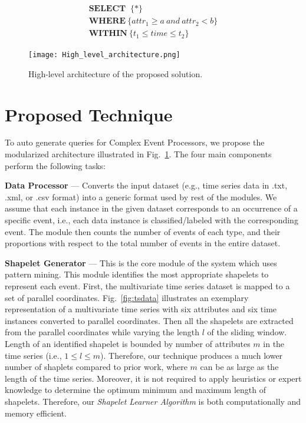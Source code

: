 \documentclass[conference]{IEEEtran}  %
\begin{document}
\begin{equation}
\begin{split}
\textbf{SELECT }\ \{*\} \\ \textbf{WHERE}\ \{attr_1\geq a\ and \ attr_2<b\} \\ \textbf{WITHIN}\ \{t_1\leq time\leq t_2\}
\end{split}
\end{equation}

\begin{figure}
\texttt{[image: High\_level\_architecture.png]}
\caption{High-level architecture of the proposed solution.}
\label{fig:archi}
\end{figure}

\section{Proposed Technique}
To auto generate queries for Complex Event Processors, we propose the modularized architecture illustrated in Fig.~\ref{fig:archi}. The four main components perform the following tasks:

\textbf{Data Processor} --- Converts the input dataset (e.g., time series data in .txt, .xml, or .csv format) into a generic format used by rest of the modules. We assume that each instance in the given dataset corresponds to an occurrence of a specific event, i.e., each data instance is classified/labeled with the corresponding event. The module then counts the number of events of each type, and their proportions with respect to the total number of events in the entire dataset.

\textbf{Shapelet Generator}	--- This is the core module of the system which uses pattern mining. This module identifies the most appropriate shapelets to represent each event. First, the multivariate time series dataset is mapped to a set of parallel coordinates. Fig.~\ref{fig:tsdata} illustrates an exemplary representation of a multivariate time series with six attributes and six time instances converted to parallel coordinates. Then all the shapelets are extracted from the parallel coordinates while varying the length $l$ of the sliding window. Length of an identified shapelet is bounded by number of attributes $m$ in the time series (i.e., $1 \leq l \leq m$). Therefore, our technique produces a much lower number of shaplets compared to prior work, where $m$ can be as large as the length of the time series. Moreover, it is not required to apply heuristics or expert knowledge to determine the optimum minimum and maximum length of shapelets. Therefore, our \textit{Shapelet Learner Algorithm} is both computationally and memory efficient.
\end{document}
